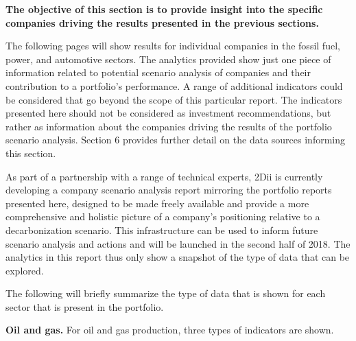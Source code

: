 \documentclass[10pt,table,a4]{article}\usepackage[]{graphicx}\usepackage[]{color}
\begin{document}
	\begin{multicols}{2}
		
		\textbf{The objective of this section is to provide insight into the specific companies driving the results presented in the previous sections.}
		
		The following pages will show results for individual companies in the fossil fuel, power, and automotive sectors. The analytics provided show just one piece of information related to potential scenario analysis of companies and their contribution to a portfolio's performance. A range of additional indicators could be considered that go beyond the scope of this particular report. The indicators presented here should not be considered as investment recommendations, but rather as information about the companies driving the results of the portfolio scenario analysis. Section 6 provides further detail on the data sources informing this section. 
		
		As part of a partnership with a range of technical experts, 2Dii is currently developing a company scenario analysis report mirroring the portfolio reports presented here, designed to be made freely available and provide a more comprehensive and holistic picture of a company's positioning relative to a decarbonization scenario. This infrastructure can be used to inform future scenario analysis and actions and will be launched in the second half of 2018. The analytics in this report thus only show a snapshot of the type of data that can be explored. 
		
		The following will briefly summarize the type of data that is shown for each sector that is present in the portfolio. 
		
		\textbf{Oil and gas.} For oil and gas production, three types of indicators are shown. 
		

\end{multicols}
\end{document}

